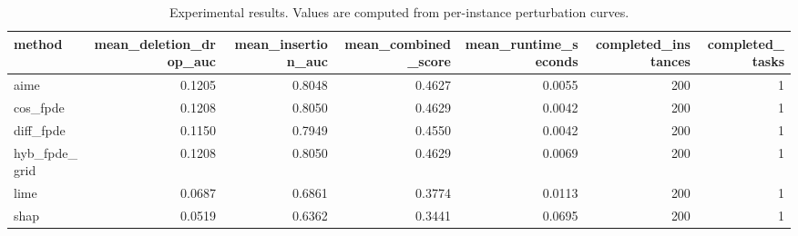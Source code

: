 \begin{table}[t]
\caption{Experimental results. Values are computed from per-instance perturbation curves.}
\label{tab:main_results_computed}
\centering
\begin{tabular}{lrrrrrr}
\toprule
method & mean\_deletion\_drop\_auc & mean\_insertion\_auc & mean\_combined\_score & mean\_runtime\_seconds & completed\_instances & completed\_tasks \\
\midrule
aime & 0.1205 & 0.8048 & 0.4627 & 0.0055 & 200 & 1 \\
cos\_fpde & 0.1208 & 0.8050 & 0.4629 & 0.0042 & 200 & 1 \\
diff\_fpde & 0.1150 & 0.7949 & 0.4550 & 0.0042 & 200 & 1 \\
hyb\_fpde\_grid & 0.1208 & 0.8050 & 0.4629 & 0.0069 & 200 & 1 \\
lime & 0.0687 & 0.6861 & 0.3774 & 0.0113 & 200 & 1 \\
shap & 0.0519 & 0.6362 & 0.3441 & 0.0695 & 200 & 1 \\
\bottomrule
\end{tabular}

\end{table}
